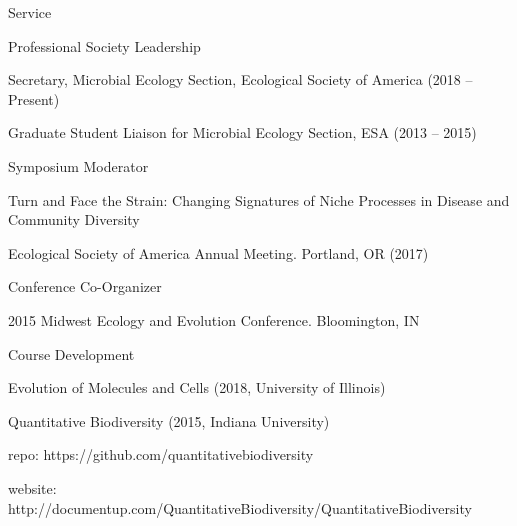 \documentclass{resume} %
\begin{document}
\begin{rSection}{Service}
    \begin{rSubsection}{Professional Society Leadership}{}{}{}
        \item Secretary, Microbial Ecology Section, Ecological Society of America (2018 -- Present)
        \item Graduate Student Liaison for Microbial Ecology Section, ESA
              (2013 -- 2015)
    \end{rSubsection}


    \begin{rSubsection}{Symposium Moderator}{}{}{}
        \item Turn and Face the Strain: Changing Signatures of Niche
        Processes in Disease and Community Diversity
			\item Ecological Society of America Annual Meeting. Portland, OR (2017)
    \end{rSubsection}

    \begin{rSubsection}{Conference Co-Organizer}{}{}{}
        \item 2015 Midwest Ecology and Evolution Conference.
				Bloomington, IN
    \end{rSubsection}

    \begin{rSubsection}{Course Development}{}{}{}
        \item Evolution of Molecules and Cells (2018, University of Illinois)
        \item Quantitative Biodiversity (2015, Indiana University)
        \item \hspace{2ex} repo: https://github.com/quantitativebiodiversity
        \item \hspace{2ex} website:
        http://documentup.com/QuantitativeBiodiversity/QuantitativeBiodiversity
    \end{rSubsection}

\end{rSection}
\end{document}
